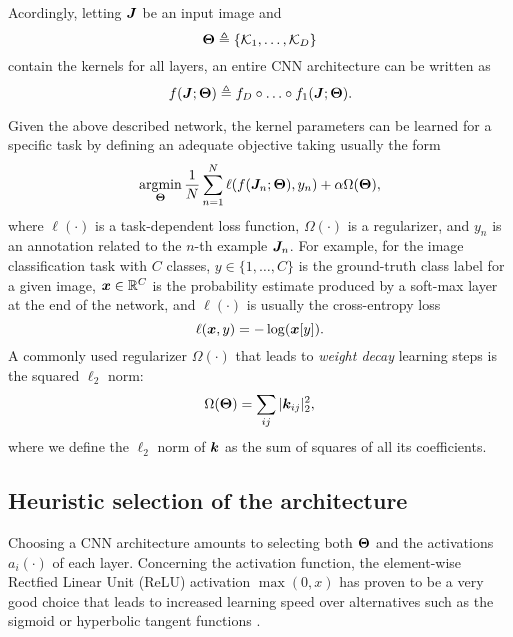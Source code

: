 Acordingly, letting $\bm{J}$ be an input image and
\begin{equation}
\bm{\Theta} \triangleq \{\mathcal{K}_1, \ldots, \mathcal{K}_D\}
\end{equation}
contain the kernels for all layers, an entire CNN architecture can be written as
\begin{equation}
f(\bm{J}; \bm{\Theta}) \triangleq f_{D} \circ \ldots \circ f_1(\bm{J}; \bm{\Theta}).
\end{equation}

Given the above described network, the kernel parameters can be learned for a specific task by defining an adequate objective taking usually the form
\begin{equation} \label{eq:obj}
  \operatorname*{argmin}_{\bm{\Theta}} \frac{1}{N} \sum_{n=1}^N \ell(f(\bm{J}_n; \bm{\Theta}), y_n) + \alpha \Omega(\bm{\Theta}),
\end{equation}
where $\ell(\cdot)$ is a task-dependent loss function, $\Omega(\cdot)$ is a regularizer, and $y_n$ is an annotation related to the $n$-th example $\bm{J}_n$. For example, for the image classification task with $C$ classes, $y \in \{1,\ldots, C\}$ is the ground-truth class label for a given image, $\bm{x} \in \mathbb R^C$ is the probability estimate produced by a soft-max layer at the end of the network, and $\ell(\cdot)$ is usually the cross-entropy loss
\begin{equation}
  \ell(\bm{x}, y) = - \log(\bm{x}[y]).
\end{equation}
A commonly used regularizer $\Omega(\cdot)$ that leads to \emph{weight decay} learning steps \cite{Krizhevsky2012} is the squared $\ell_2$ norm:
\begin{equation}\label{eq:reg0}
  \Omega(\bm{\Theta}) = \sum_{ij} |\bm{k}_{ij}|_2^2,
\end{equation}
where we define the $\ell_2$ norm of $\bm{k}$ as the sum of squares of all its coefficients.

\subsection{Heuristic selection of the architecture}
Choosing a CNN architecture amounts to selecting both $\bm{\Theta}$ and the activations $a_i(\cdot)$ of each layer. Concerning the activation function, the element-wise Rectfied Linear Unit (ReLU) activation $\max(0,x)$ has proven to be a very good choice that leads to increased learning speed over alternatives such as the sigmoid or hyperbolic tangent functions \cite{Krizhevsky2012,?}.


